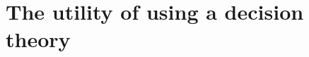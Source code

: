\documentclass[a4paper]{article}
\newcommand\EU{\mathrm{EU}}
\newcommand\U{\mathfrak{U}} %
\newcommand{\todoinfo}[2][]{\todo[backgroundcolor=orange!80,bordercolor=black,linecolor=gray!80, #1,inline,caption={}]{#2}}
\renewcommand{\color}[1]{}
\newenvironment{colored}[1]{\leavevmode\color{#1}}{}
\newenvironment{CCM rewritten}
{\begingroup\color{blue}} %
{\endgroup}              %
\begin{document}






\section{The utility of using a decision theory}\label{sect:nu}




\end{document}
